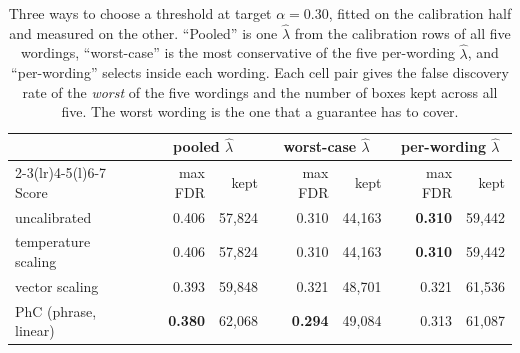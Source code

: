 \begin{table}[t]
\caption{Three ways to choose a threshold at target $\alpha=0.30$, fitted on the calibration half and measured on the other. ``Pooled'' is one $\hat\lambda$ from the calibration rows of all five wordings, ``worst-case'' is the most conservative of the five per-wording $\hat\lambda$, and ``per-wording'' selects inside each wording. Each cell pair gives the false discovery rate of the \emph{worst} of the five wordings and the number of boxes kept across all five. The worst wording is the one that a guarantee has to cover.}
\label{tab:fdr}
\begin{tabular*}{\textwidth}{@{\extracolsep{\fill}}lrrrrrr@{}}
\toprule
 & \multicolumn{2}{c}{pooled $\hat\lambda$} & \multicolumn{2}{c}{worst-case $\hat\lambda$} & \multicolumn{2}{c}{per-wording $\hat\lambda$} \\
\cmidrule(lr){2-3}\cmidrule(lr){4-5}\cmidrule(l){6-7}
Score & max FDR & kept & max FDR & kept & max FDR & kept \\
\midrule
uncalibrated & 0.406 & 57{,}824 & 0.310 & 44{,}163 & \textbf{0.310} & 59{,}442 \\
temperature scaling & 0.406 & 57{,}824 & 0.310 & 44{,}163 & \textbf{0.310} & 59{,}442 \\
vector scaling & 0.393 & 59{,}848 & 0.321 & 48{,}701 & 0.321 & 61{,}536 \\
PhC (phrase, linear) & \textbf{0.380} & 62{,}068 & \textbf{0.294} & 49{,}084 & 0.313 & 61{,}087 \\
\bottomrule
\end{tabular*}
\end{table}
